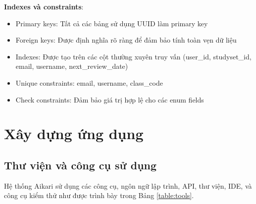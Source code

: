 \documentclass[../DoAn.tex]{subfiles}
\begin{document}
\textbf{Indexes và constraints}:

\begin{itemize}
    \item Primary keys: Tất cả các bảng sử dụng UUID làm primary key
    \item Foreign keys: Được định nghĩa rõ ràng để đảm bảo tính toàn vẹn dữ liệu
    \item Indexes: Được tạo trên các cột thường xuyên truy vấn (user\_id, studyset\_id, email, username, next\_review\_date)
    \item Unique constraints: email, username, class\_code
    \item Check constraints: Đảm bảo giá trị hợp lệ cho các enum fields
\end{itemize}

\section{Xây dựng ứng dụng}
\label{section:4.3}

\subsection{Thư viện và công cụ sử dụng}
\label{subsection:4.3.1}

Hệ thống Aikari sử dụng các công cụ, ngôn ngữ lập trình, API, thư viện, IDE, và công cụ kiểm thử như được trình bày trong Bảng \ref{table:tools}.
\end{document}
